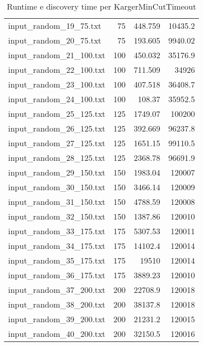 \begin{table}[H]
\begin{tabular}{lrrr}
     input\_random\_19\_75.txt  &      75 &          448.759 &      10435.2   \\
     input\_random\_20\_75.txt  &      75 &          193.605 &       9940.02  \\
     input\_random\_21\_100.txt &     100 &          450.032 &      35176.9   \\
     input\_random\_22\_100.txt &     100 &          711.509 &      34926     \\
     input\_random\_23\_100.txt &     100 &          407.518 &      36408.7   \\
     input\_random\_24\_100.txt &     100 &          108.37  &      35952.5   \\
     input\_random\_25\_125.txt &     125 &         1749.07  &     100200     \\
     input\_random\_26\_125.txt &     125 &          392.669 &      96237.8   \\
     input\_random\_27\_125.txt &     125 &         1651.15  &      99110.5   \\
     input\_random\_28\_125.txt &     125 &         2368.78  &      96691.9   \\
     input\_random\_29\_150.txt &     150 &         1983.04  &     120007     \\
     input\_random\_30\_150.txt &     150 &         3466.14  &     120009     \\
     input\_random\_31\_150.txt &     150 &         4788.59  &     120008     \\
     input\_random\_32\_150.txt &     150 &         1387.86  &     120010     \\
     input\_random\_33\_175.txt &     175 &         5307.53  &     120011     \\
     input\_random\_34\_175.txt &     175 &        14102.4   &     120014     \\
     input\_random\_35\_175.txt &     175 &        19510     &     120014     \\
     input\_random\_36\_175.txt &     175 &         3889.23  &     120010     \\
     input\_random\_37\_200.txt &     200 &        22708.9   &     120018     \\
     input\_random\_38\_200.txt &     200 &        38137.8   &     120018     \\
     input\_random\_39\_200.txt &     200 &        21231.2   &     120015     \\
     input\_random\_40\_200.txt &     200 &        32150.5   &     120016     \\
     \hline
    \end{tabular}

    \caption{Runtime e discovery time per KargerMinCutTimeout}
    \label{table:kargertimeout-running-time}
\end{table}

